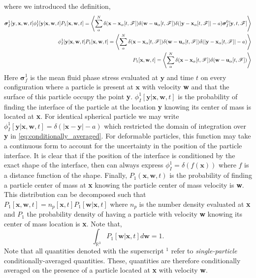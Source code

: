 where we introduced the definition, 
\begin{align}
    \bm\sigma^1_f[\textbf{y},\textbf{x},\textbf{w},t]
    \phi_I^1[\textbf{y}|\textbf{x},\textbf{w},t] 
    P_1[\textbf{x},\textbf{w},t]
    = 
    \avg{
    \sum_\alpha^N 
    \delta(\textbf{x} - \textbf{x}_\alpha[t,\FF])
    \delta(\textbf{w} - \textbf{u}_\alpha[t,\FF])
    \delta(|\textbf{y} - \textbf{x}_{\alpha}[t,\FF]|-a)
    \bm\sigma_f^0[\textbf{y},t,\FF]
    }
    \label{eq:sigma_f_1}
    \\
    \phi_I^1[\textbf{y}|\textbf{x},\textbf{w},t] 
    P_1[\textbf{x},\textbf{w},t]
    = 
    \avg{
    \sum_\alpha^N 
    \delta(\textbf{x} - \textbf{x}_\alpha[t,\FF])
    \delta(\textbf{w} - \textbf{u}_\alpha[t,\FF])
    \delta(|\textbf{y} - \textbf{x}_{\alpha}[t,\FF]|-a)
    }\\
    P_1[\textbf{x},\textbf{w},t]
    = 
    \avg{
    \sum_\alpha^N 
    \delta(\textbf{x} - \textbf{x}_\alpha[t,\FF])
    \delta(\textbf{w} - \textbf{u}_\alpha[t,\FF])
    }
\end{align}
Here $\bm\sigma^1_f$ is the mean fluid phase stress evaluated at $\textbf{y}$ and time $t$ on every configuration where a particle is present at $\textbf{x}$ with velocity \textbf{w} and that the surface of this particle occupy the point \textbf{y}.
$\phi_I^1[\textbf{y}|\textbf{x},\textbf{w},t] $ is the probability of finding the interface of the particle at the location \textbf{y} knowing its center of mass is located at \textbf{x}. 
For identical spherical particle we may write $\phi_I^1[\textbf{y}|\textbf{x},\textbf{w},t] = \delta(|\textbf{x} - \textbf{y}| -a)$ which restricted the domain of integration over \textbf{y} in \ref{eq:conditionally_averaged}. 
For deformable particles, this function may take a continuous form to account for the uncertainty in the position of the particle interface. 
It is clear that if the position of the interface is conditioned by the exact shape of the interface, then can always express $\phi_I^1 = \delta(f(\textbf{x}))$ where $f$ is a distance function of the shape. 
Finally, $P_1(\textbf{x},\textbf{w},t)$ is the probability of finding a particle center of mass at \textbf{x} knowing the particle center of mass velocity is  \textbf{w}.
This distribution can be decomposed such that $P_1[\textbf{x},\textbf{w},t] = n_p[\textbf{x},t] P_1[\textbf{w}|\textbf{x},t]$ where $n_p$ is the number density evaluated at \textbf{x} and $P_1$ the probability density of having a particle with velocity \textbf{w} knowing its center of mass location is \textbf{x}. 
Note that, 
\begin{equation*}
    \int_{\mathbb{R}^3} P_1[\textbf{w}|\textbf{x},t] d \textbf{w} = 1. 
\end{equation*}
Note that all quantities denoted with the superscript $^1$ refer to \textit{single-particle} conditionally-averaged  quantities.  
These, quantities are therefore conditionally averaged on the presence of a particle located at \textbf{x} with velocity \textbf{w}. 

